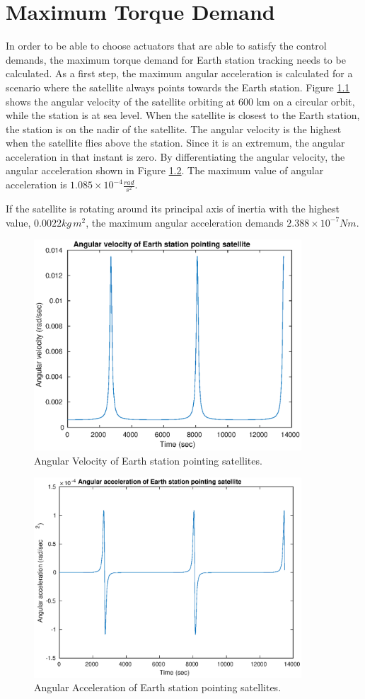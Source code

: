 \chapter{Maximum Torque Demand}
\label{sec:maxTorque}

In order to be able to choose actuators that are able to satisfy the control demands, the maximum torque demand for Earth station tracking needs to be calculated. As a first step, the maximum angular acceleration is calculated for a scenario where the satellite always points towards the Earth station. Figure \ref{fig:maxOmega} shows the angular velocity of the satellite orbiting at 600 km on a circular orbit, while the station is at sea level. When the satellite is closest to the Earth station, the station is on the nadir of the satellite. The angular velocity is the highest when the satellite flies above the station. Since it is an extremum, the angular acceleration in that instant is zero. By differentiating the angular velocity, the angular acceleration shown in Figure \ref{fig:maxOmegaDot}. The maximum value of angular acceleration is $1.085 \times 10^{-4} \frac{rad}{s^2}$. 

If the satellite is rotating around its principal axis of inertia with the highest value, $0.0022 k\!g \, m^2$, the maximum angular acceleration demands  \boldmath$ 2.388 \times 10^{-7} Nm$.

\begin{figure}[H]
	\centering
	\includegraphics[width=100mm]{figures/maxOmega}
	\caption{Angular Velocity of Earth station pointing satellites.}
	\label{fig:maxOmega}
\end{figure} 

\begin{figure}[H]
	\centering
	\includegraphics[width=100mm]{figures/maxOmegaDot}
	\caption{Angular Acceleration of Earth station pointing satellites.}
	\label{fig:maxOmegaDot}
\end{figure} 